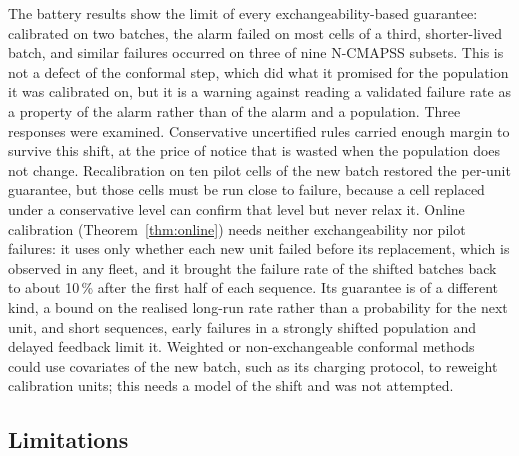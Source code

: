 The battery results show the limit of every exchangeability-based guarantee: calibrated on two batches, the alarm failed on most cells of a third, shorter-lived batch, and similar failures occurred on three of nine N-CMAPSS subsets. This is not a defect of the conformal step, which did what it promised for the population it was calibrated on, but it is a warning against reading a validated failure rate as a property of the alarm rather than of the alarm and a population. Three responses were examined. Conservative uncertified rules carried enough margin to survive this shift, at the price of notice that is wasted when the population does not change. Recalibration on ten pilot cells of the new batch restored the per-unit guarantee, but those cells must be run close to failure, because a cell replaced under a conservative level can confirm that level but never relax it. Online calibration (Theorem~\ref{thm:online}) needs neither exchangeability nor pilot failures: it uses only whether each new unit failed before its replacement, which is observed in any fleet, and it brought the failure rate of the shifted batches back to about 10\,\% after the first half of each sequence. Its guarantee is of a different kind, a bound on the realised long-run rate rather than a probability for the next unit, and short sequences, early failures in a strongly shifted population and delayed feedback limit it. Weighted or non-exchangeable conformal methods~\cite{tibshirani2019,barber2023} could use covariates of the new batch, such as its charging protocol, to reweight calibration units; this needs a model of the shift and was not attempted.

\subsection{Limitations}

